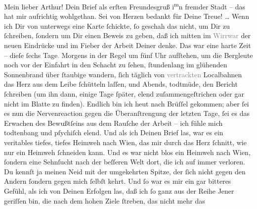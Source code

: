 \pstart\center{}Mein lieber Arthur!\pend\vspace{0.5em}
\pstart
           Dein Brief als erſten Freundesgruß i\substVorne{}\textsuperscript{m}\substDazwischen{}n\substHinten{} fremder Stadt – das
               hat mir aufrichtig wohlgethan. Sei von Herzen bedankt für Deine Treue! {\dots} Wenn ich Dir von unterwegs eine Karte{ }ſchickte,{ }ſo
               geschah das nicht, um Dir zu{ }ſchreiben,{ }ſondern um Dir einen Beweis zu geben, daß ich
               mitten im \textcolor{gray}{Wirrwar} der neuen Eindrücke und im Fieber der Arbeit
               Deiner denke. Das war eine harte Zeit – dieſe{ }ſechs Tage\textcolor{gray}{.} Morgens
               in der Regel um fünf Uhr aufſtehen, um die Bergleute noch vor der Einfahrt in den
               Schacht zu{ }ſehen,{ }ſtundenlang im glühenden Sonnenbrand über{ }ſtaubige \label{K_L02663-1v}\label{K_L02663-1} wandern,{ }ſich täglich von \textcolor{gray}{vertrackten} Localbahnen das Herz aus dem Leibe{ }ſchütteln laſſen, und Abends, todtmüde, den Bericht{ }ſchreiben (um ihn dann\strikeout{)}, einige Tage{ }ſpäter, elend zuſammengeſtrichen oder
               gar nicht im Blatte zu
               finden). Endlich  bin ich heut nach Brüſſel gekommen; aber{ }ſei es nun die Nervenreaction gegen die
               Überanſtrengung der letzten Tage,{ }ſei es das Erwachen des Bewußtſeins aus dem Rauſche
               der Arbeit – ich fühle mich todtenbang und pſychiſch elend. Und als ich Deinen Brief
               las, war es ein veritables tiefes, tiefes Heimweh nach Wien, das mir durch das Herz{ }ſchnitt, {\pb}wie
               nur ein Heimweh{ }ſchneiden kann. Und es war nicht blos ein Heimweh nach Wien,{ }ſondern eine Sehnſucht nach der beſſeren Welt
               dort, die ich auf immer verloren. Du kennſt ja meinen Neid mit der umgekehrten
               Spitze, der{ }ſich nicht gegen den Andern{ }ſondern gegen mich{ }ſelbſt kehrt. Und{ }ſo war
               es mir ein gar bitteres Gefühl, als ich von Deinen Erfolgen las, daß ich{ }ſo ganz aus
               der Reihe Jener geriſſen bin, die nach dem hohen Ziele{ }ſtreben, das nicht mehr das
